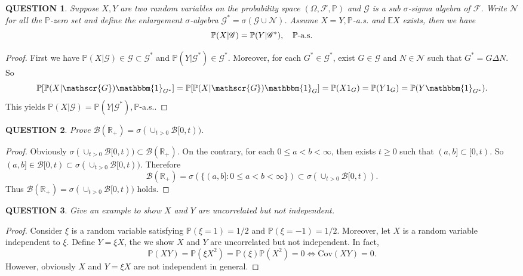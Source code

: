 \documentclass[12pt]{article}
\renewcommand{\b}{\mathscr{B}}
\renewcommand{\(}{\left(}%
\renewcommand{\)}{\right)}%
\renewcommand{\[}{\left[}%
\renewcommand{\]}{\right]}%
\renewcommand{\r}{\mathbb{R}}
\newcommand{\p}{\mathbb{P}}
\newcommand{\f}{\mathscr{F}}
\newcommand{\g}{\mathscr{G}}
\newtheorem{question}{QUESTION}[section]}
\newtheorem{proof}{Proof.}}
\begin{document}
  \begin{question}
   Suppose $X,Y$ are two random variables on the probability space $(\Omega ,\f,\p )$ and $\g$ is a sub $\sigma$-sigma algebra of $\f$. Write $\mathscr{N}$ for all the $\p$-zero set and define the enlargement $\sigma $-algebra $\g^*=\sigma(\g\cup\mathscr{N} )$. Assume $X=Y,\p$-a.s. and $\mathbb{E}X$ exists, then we have
   \begin{equation*}
    \p(X|\g)=\p(Y|\g^*),\quad \p\text{\rmfamily -a.s.}
   \end{equation*}
  \end{question}
  \begin{proof}
   First we have $\p(X|\g)\in\g\subset\g^*$ and $\p(Y|\g^*)\in\g^*$. Moreover, for each $G^*\in\g^*$, exist $G\in\g$ and $N\in\mathscr{N}$ such that $G^*=G\Delta N$. So
   \begin{equation*}
    \p[\p(X|\g)\mathbbm{1}_{G^*}]=\p[\p(X|\g)\mathbbm{1}_{G}]=\p(X1_G)=\p(Y1_G)=\p(Y\mathbbm{1}_{G^*}).
   \end{equation*}
   This yields $\p(X|\g)=\p(Y|\g^*),\p$-a.s..
  \end{proof}

  \begin{question}
   Prove $\b(\r_+)=\sigma( \cup_{t> 0}\b[0,t))$.
  \end{question}
  \begin{proof}
   Obviously $\sigma( \cup_{t> 0}\b[0,t))\subset\b(\r_+)$. On the contrary, for each $0\leq a<b<\infty$, then exists $t\geq 0$ such that $(a,b]\subset [0,t)$. So $(a,b]\in \b[0,t)\subset \sigma( \cup_{t> 0}\b[0,t))$. Therefore
     \begin{equation*}
      \b(\r_+)=\sigma(\{(a,b]:0\leq a<b<\infty\})\subset \sigma( \cup_{t> 0}\b[0,t)).
     \end{equation*}
     Thus $\b(\r_+)=\sigma( \cup_{t> 0}\b[0,t))$ holds.
  \end{proof}

  \begin{question}
   Give an example to show $X$ and $Y$ are uncorrelated but not independent.
  \end{question}
  \begin{proof}
   Consider $\xi$ is a random variable satisfying $\p(\xi=1)=1/2$ and $\p(\xi=-1)=1/2$. Moreover, let $X$ is a random variable independent to $\xi$. Define $Y=\xi X$, the we show $X$ and $Y$ are uncorrelated but not independent. In fact,
   \begin{equation*}
    \p(XY)=\p(\xi X^2)=\p(\xi)\p(X^2)=0\Longleftrightarrow \mathrm{Cov}(XY)=0.
   \end{equation*}
   However, obviously $X$ and $Y=\xi X$ are not independent in general.
  \end{proof}
\end{document}
